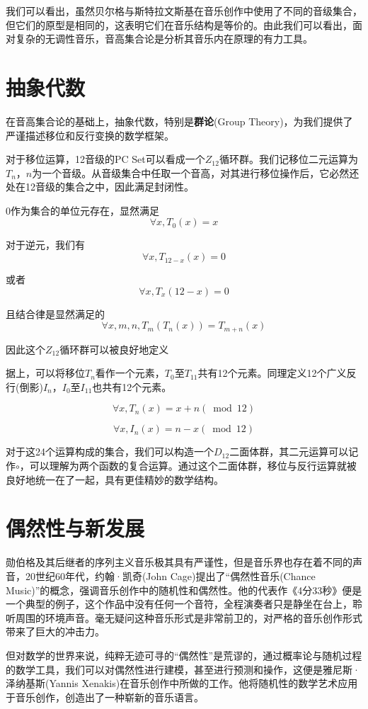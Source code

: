 \documentclass{article}
\begin{document}
我们可以看出，虽然贝尔格与斯特拉文斯基在音乐创作中使用了不同的音级集合，但它们的原型是相同的，这表明它们在音乐结构是等价的。由此我们可以看出，面对复杂的无调性音乐，音高集合论是分析其音乐内在原理的有力工具。

\section{抽象代数}
在音高集合论的基础上，抽象代数，特别是\textbf{群论}(Group Theory)，为我们提供了严谨描述移位和反行变换的数学框架\cite{lewin1987gmit}。

对于移位运算，12音级的PC Set可以看成一个$Z_{12}$循环群。我们记移位二元运算为$T_n$，$n$为一个音级。从音级集合中任取一个音高，对其进行移位操作后，它必然还处在12音级的集合之中，因此满足封闭性。

0作为集合的单位元存在，显然满足
\[
    \forall x , T_0(x) = x
\]

对于逆元，我们有
\[
    \forall x , T_{12-x}(x) = 0
\]

或者
\[
    \forall x , T_{x}(12-x) = 0
\]

且结合律是显然满足的
\[
    \forall x, m, n , T_m(T_n(x)) = T_{m+n}(x)
\]

因此这个$Z_{12}$循环群可以被良好地定义

据上，可以将移位$T_n$看作一个元素，$T_0$至$T_{11}$共有12个元素。同理定义12个广义反行(倒影)$I_n$，$I_0$至$I_{11}$也共有12个元素。

\[
    \forall x , T_{n}(x) = x + n (\bmod 12)
\]

\[
    \forall x , I_{n}(x) = n - x (\bmod 12)
\]

对于这24个运算构成的集合，我们可以构造一个$D_{12}$二面体群，其二元运算可以记作$\circ$，可以理解为两个函数的复合运算。通过这个二面体群，移位与反行运算就被良好地统一在了一起，具有更佳精妙的数学结构。

\section{偶然性与新发展}
勋伯格及其后继者的序列主义音乐极其具有严谨性，但是音乐界也存在着不同的声音，20世纪60年代，约翰·凯奇(John Cage)提出了“偶然性音乐(Chance Music)”的概念，强调音乐创作中的随机性和偶然性。他的代表作《4分33秒》便是一个典型的例子，这个作品中没有任何一个音符，全程演奏者只是静坐在台上，聆听周围的环境声音。毫无疑问这种音乐形式是非常前卫的，对严格的音乐创作形式带来了巨大的冲击力。

但对数学的世界来说，纯粹无迹可寻的“偶然性”是荒谬的，通过概率论与随机过程的数学工具，我们可以对偶然性进行建模，甚至进行预测和操作，这便是雅尼斯·泽纳基斯(Yannis Xenakis)在音乐创作中所做的工作。他将随机性的数学艺术应用于音乐创作，创造出了一种崭新的音乐语言\cite{xenakis1992formalized}。
\end{document}
